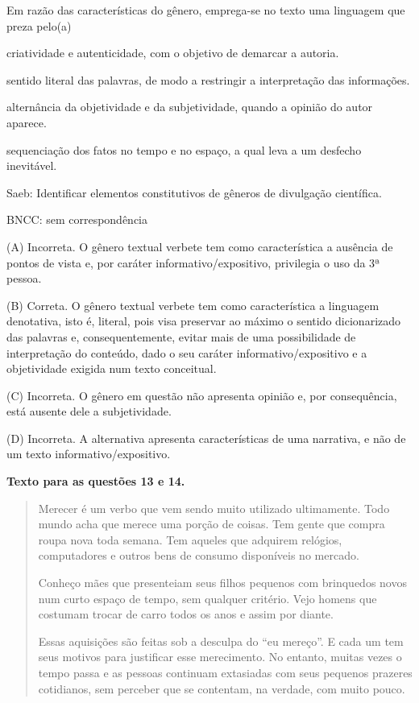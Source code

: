 Em razão das características do gênero, emprega-se no texto uma
linguagem que preza pelo(a)

\begin{escolha}
\item criatividade e autenticidade, com o objetivo de demarcar a autoria.

\item sentido literal das palavras, de modo a restringir a interpretação
das informações.

\item alternância da objetividade e da subjetividade, quando a opinião do
autor aparece.

\item sequenciação dos fatos no tempo e no espaço, a qual leva a um
desfecho inevitável.
\end{escolha}

Saeb: Identificar elementos constitutivos de gêneros de divulgação
científica.

BNCC: sem correspondência

(A) Incorreta. O gênero textual verbete tem como característica a
ausência de pontos de vista e, por caráter informativo/expositivo,
privilegia o uso da 3ª pessoa.

(B) Correta. O gênero textual verbete tem como característica a
linguagem denotativa, isto é, literal, pois visa preservar ao máximo o
sentido dicionarizado das palavras e, consequentemente, evitar mais de
uma possibilidade de interpretação do conteúdo, dado o seu caráter
informativo/expositivo e a objetividade exigida num texto conceitual.

(C) Incorreta. O gênero em questão não apresenta opinião e, por
consequência, está ausente dele a subjetividade.

(D) Incorreta. A alternativa apresenta características de uma narrativa,
e não de um texto informativo/expositivo.

\textbf{Texto para as questões 13 e 14.}

\begin{quote}
Merecer é um verbo que vem sendo muito utilizado ultimamente. Todo mundo
acha que merece uma porção de coisas. Tem gente que compra roupa nova
toda semana. Tem aqueles que adquirem relógios, computadores e outros
bens de consumo disponíveis no mercado.

Conheço mães que presenteiam seus filhos pequenos com brinquedos novos
num curto espaço de tempo, sem qualquer critério. Vejo homens que
costumam trocar de carro todos os anos e assim por diante.

Essas aquisições são feitas sob a desculpa do ``eu mereço''. E cada um
tem seus motivos para justificar esse merecimento. No entanto, muitas
vezes o tempo passa e as pessoas continuam extasiadas com seus pequenos
prazeres cotidianos, sem perceber que se contentam, na verdade, com
muito pouco.
\end{quote}

